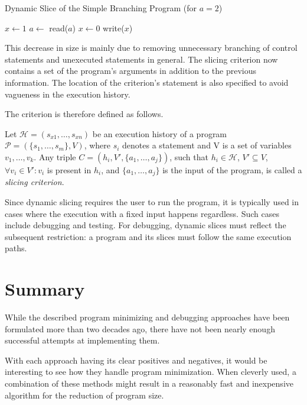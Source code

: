 
\begin{algorithm}
	\caption{Dynamic Slice of the Simple Branching Program (for $a = 2$)} 
	\begin{algorithmic}[1]
		\State $x \leftarrow 1$
		\State $a \leftarrow$ read($a$)
		\State $x \leftarrow 0$
		\State write($x$)
	\end{algorithmic}
\end{algorithm}

This decrease in size is mainly due to removing unnecessary 
branching of control statements and unexecuted statements in general. 
The slicing criterion now contains a set of the program's 
arguments in addition to the previous information. 
The location of the criterion's statement is also specified to avoid 
vagueness in the execution history. 

The criterion is therefore defined as follows.

\begin{defn}\label{def02:5}
  Let $\mathcal{H} = (s_{x1},\dots,s_{xn})$ be an execution history of a program 
  $\mathcal{P} = (\{s_1,\dots,s_m\}, V)$, where $s_i$ denotes a statement
  and V is a set of variables $v_1,\dots,v_k$.
  Any triple $C = (h_i, V', \{a_1,\dots,a_j\})$, such that $h_i \in \mathcal{H}$,
  $V' \subseteq V$, $\forall v_i \in V': v_i$ is present in $h_i$,
  and $\{a_1,\dots,a_j\}$ is the input of the program,
  is called a \emph{slicing criterion}.
\end{defn}

Since dynamic slicing requires the user to run the program, 
it is typically used in cases where the execution with a fixed 
input happens regardless. Such cases include debugging and testing. 
For debugging, dynamic slices must reflect the subsequent restriction: 
a program and its slices must follow the same execution paths.

\section{Summary}

While the described program minimizing and debugging approaches have been 
formulated more than two decades ago, there have not been nearly enough 
successful attempts at implementing them. 

With each approach having its clear positives and negatives, 
it would be interesting to see how they handle program minimization. 
When cleverly used, a combination of these methods might 
result in a reasonably fast and inexpensive algorithm 
for the reduction of program size.

